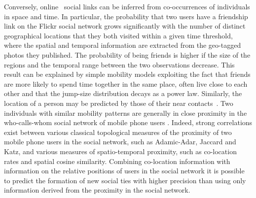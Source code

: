 Conversely, online~\cite{eagle_2009_inferring,crandall_2010_inferring,picornell_2015_exploring} social links can be inferred from co-occurrences of individuals in space and time. In particular, the probability that two users have a friendship link on the Flickr social network grows significantly with the number of distinct geographical locations that they both visited within a given time threshold, where the spatial and temporal information are extracted from the geo-tagged photos they published. 
The probability of being friends is higher if the size of the regions and the temporal range between the two observations decrease. 
This result can be explained by simple mobility models exploiting the fact that friends are more likely to spend time together in the same place, often live close to each other and that the jump-size distribution decays as a power law. Similarly, the location of a person may be predicted by those of their near contacts~\cite{backstrom_2010_find}. Two individuals with similar mobility patterns are generally in close proximity in the who-calls-whom social network of mobile phone users \cite{wang_2011_human}. 
Indeed, strong correlations exist between various classical topological measures of the proximity of two mobile phone users in the social network, such as Adamic-Adar, Jaccard and Katz, and various measures of spatio-temporal proximity, such as co-location rates and spatial cosine similarity. 
Combining co-location information with information on the relative positions of users in the social network it is possible to predict the formation of new social ties with higher precision than using only information derived from the proximity in the social network. 

